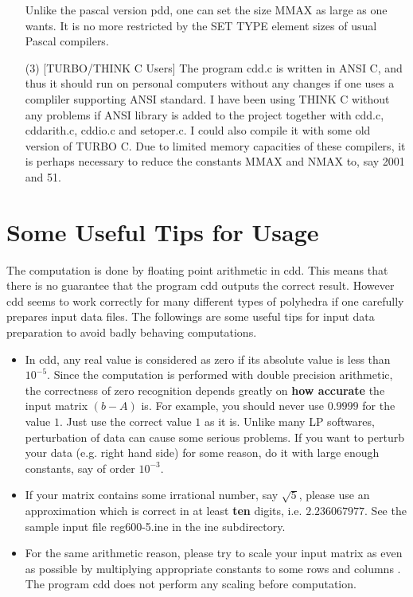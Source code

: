 \begin{itemize}
Unlike the pascal version pdd, one can set the size MMAX as large as one
wants.  It is no more restricted by the SET TYPE element sizes of 
usual Pascal compilers.

\item[(3)] [TURBO/THINK C Users] The program cdd.c is written in
ANSI C, and thus it should run on
personal computers without any changes if one uses a compliler supporting
ANSI standard. I have been using  THINK C without
any problems if ANSI library is added to the project together with
cdd.c, cddarith.c, cddio.c and setoper.c.  I could also compile it with some
old version of TURBO C.  Due to limited memory capacities of
these compilers, it is perhaps necessary to reduce the constants MMAX and NMAX
to, say 2001 and 51.
\end{itemize}


\section{Some  Useful Tips for Usage}  \label{TIPS}

The computation is done by floating point arithmetic in cdd.  This means that
there is no guarantee that the program cdd outputs the correct result.  However cdd
seems to work correctly for many different types of polyhedra if one
carefully prepares input data files.   The followings
are some useful tips  for  input data preparation to 
avoid badly behaving computations.

\begin{itemize}

\item  In cdd, any real value is considered as zero if its absolute value is
less than $10^{-5}$.  Since the computation is performed with double precision
arithmetic, the correctness of zero recognition depends greatly on {\bf how
accurate\/} the input matrix $(b- A)$ is.  For example, you should never use
$0.9999$ for the value $1$.  Just use the correct value $1$ as it is.
Unlike many LP softwares, perturbation of data
can cause some serious problems.  If you want to perturb your data (e.g. right
hand side) for some reason, do it with large enough constants, say of order
$10^{-3}$.


\item If your matrix contains some irrational number, say
$\sqrt{5}$, please use an approximation which is correct in at least {\bf ten\/} digits,
i.e.  $2.236067977$.   See the sample input file  reg600-5.ine in the ine subdirectory.
 
\item  For the same arithmetic reason, please try to scale your input matrix
as even as possible by multiplying appropriate constants to some rows and
columns .   The program cdd does not perform any scaling before
computation.

\end{itemize}

